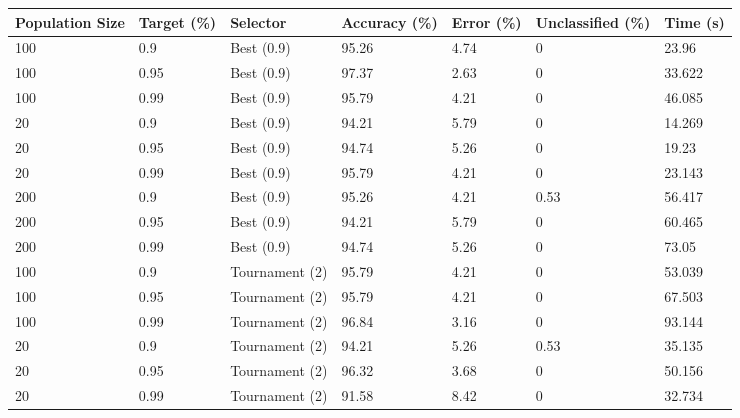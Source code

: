 \documentclass[a4paper]{article}
\begin{document}
\begin{table}[h!]
  \centering
  \begin{tabular}{@{}lllllll@{}}
    \toprule
    Population Size & Target (\%) & Selector       & Accuracy (\%) & Error (\%) & Unclassified (\%) & Time (s) \\
    \midrule
    100             & 0.9         & Best (0.9)     & 95.26         & 4.74       & 0                 & 23.96    \\
    100             & 0.95        & Best (0.9)     & 97.37         & 2.63       & 0                 & 33.622   \\
    100             & 0.99        & Best (0.9)     & 95.79         & 4.21       & 0                 & 46.085   \\
    20              & 0.9         & Best (0.9)     & 94.21         & 5.79       & 0                 & 14.269   \\
    20              & 0.95        & Best (0.9)     & 94.74         & 5.26       & 0                 & 19.23    \\
    20              & 0.99        & Best (0.9)     & 95.79         & 4.21       & 0                 & 23.143   \\
    200             & 0.9         & Best (0.9)     & 95.26         & 4.21       & 0.53              & 56.417   \\
    200             & 0.95        & Best (0.9)     & 94.21         & 5.79       & 0                 & 60.465   \\
    200             & 0.99        & Best (0.9)     & 94.74         & 5.26       & 0                 & 73.05    \\
    100             & 0.9         & Tournament (2) & 95.79         & 4.21       & 0                 & 53.039   \\
    100             & 0.95        & Tournament (2) & 95.79         & 4.21       & 0                 & 67.503   \\
    100             & 0.99        & Tournament (2) & 96.84         & 3.16       & 0                 & 93.144   \\
    20              & 0.9         & Tournament (2) & 94.21         & 5.26       & 0.53              & 35.135   \\
    20              & 0.95        & Tournament (2) & 96.32         & 3.68       & 0                 & 50.156   \\
    20              & 0.99        & Tournament (2) & 91.58         & 8.42       & 0                 & 32.734   \\

\end{tabular}
\end{table}
\end{document}
